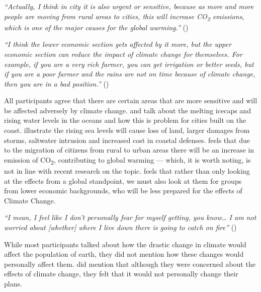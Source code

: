     \begin{quoting}
        \textit{``Actually, I think in city it is also urgent or sensitive, because as more and more people are moving from rural areas to cities, this will increase CO\textsubscript{2} emissions, which is one of the major causes for the global warming.''} ()
    \end{quoting}
    
    \begin{quoting}
        \textit{``I think the lower economic section gets affected by it more, but the upper economic section can reduce the impact of climate change for themselves. For example, if you are a very rich farmer, you can get irrigation or better seeds, but if you are a poor farmer and the rains are not on time because of climate change, then you are in a bad position.''} ()
    \end{quoting}

    All participants agree that there are certain areas that are more sensitive and will be affected adversely by climate change.  and  talk about the melting icecaps and rising water levels in the oceans and how this is problem for cities built on the coast. \citet{hitz2004estimating} illustrate the rising sea levels will cause loss of land, larger damages from storms, saltwater intrusion and increased cost in coastal defenses.  feels that due to the migration of citizens from rural to urban areas there will be an increase in emission of CO\textsubscript{2}, contributing to global warming --- which, it is worth noting, is not in line with recent research on the topic. \cite{castells2020density}  feels that rather than only looking at the effects from a global standpoint, we must also look at them for groups from lower economic backgrounds, who will be less prepared for the effects of Climate Change.
    
    \begin{quoting}
        \textit{``I mean, I feel like I don't personally fear for myself getting, you know… I am not worried about [whether] where I live down there is going to catch on fire''} ()
    \end{quoting}

    While most participants talked about how the drastic change in climate would affect the population of earth, they did not mention how these changes would personally affect them.  did mention that although they were concerned about the effects of climate change, they felt that it would not personally change their plans.
